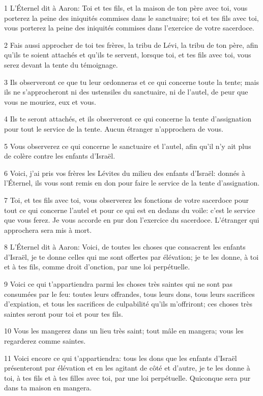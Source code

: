 \par 1 L'Éternel dit à Aaron: Toi et tes fils, et la maison de ton père avec toi, vous porterez la peine des iniquités commises dans le sanctuaire; toi et tes fils avec toi, vous porterez la peine des iniquités commises dans l'exercice de votre sacerdoce.
\par 2 Fais aussi approcher de toi tes frères, la tribu de Lévi, la tribu de ton père, afin qu'ils te soient attachés et qu'ils te servent, lorsque toi, et tes fils avec toi, vous serez devant la tente du témoignage.
\par 3 Ils observeront ce que tu leur ordonneras et ce qui concerne toute la tente; mais ils ne s'approcheront ni des ustensiles du sanctuaire, ni de l'autel, de peur que vous ne mouriez, eux et vous.
\par 4 Ils te seront attachés, et ils observeront ce qui concerne la tente d'assignation pour tout le service de la tente. Aucun étranger n'approchera de vous.
\par 5 Vous observerez ce qui concerne le sanctuaire et l'autel, afin qu'il n'y ait plus de colère contre les enfants d'Israël.
\par 6 Voici, j'ai pris vos frères les Lévites du milieu des enfants d'Israël: donnés à l'Éternel, ils vous sont remis en don pour faire le service de la tente d'assignation.
\par 7 Toi, et tes fils avec toi, vous observerez les fonctions de votre sacerdoce pour tout ce qui concerne l'autel et pour ce qui est en dedans du voile: c'est le service que vous ferez. Je vous accorde en pur don l'exercice du sacerdoce. L'étranger qui approchera sera mis à mort.
\par 8 L'Éternel dit à Aaron: Voici, de toutes les choses que consacrent les enfants d'Israël, je te donne celles qui me sont offertes par élévation; je te les donne, à toi et à tes fils, comme droit d'onction, par une loi perpétuelle.
\par 9 Voici ce qui t'appartiendra parmi les choses très saintes qui ne sont pas consumées par le feu: toutes leurs offrandes, tous leurs dons, tous leurs sacrifices d'expiation, et tous les sacrifices de culpabilité qu'ils m'offriront; ces choses très saintes seront pour toi et pour tes fils.
\par 10 Vous les mangerez dans un lieu très saint; tout mâle en mangera; vous les regarderez comme saintes.
\par 11 Voici encore ce qui t'appartiendra: tous les dons que les enfants d'Israël présenteront par élévation et en les agitant de côté et d'autre, je te les donne à toi, à tes fils et à tes filles avec toi, par une loi perpétuelle. Quiconque sera pur dans ta maison en mangera.
